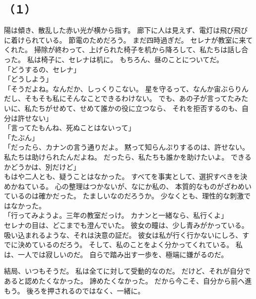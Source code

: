 \documentclass[../IHMain]{subfiles}
\begin{document}
\subsection*{（１）}
陽は傾き、散乱した赤い光が横から指す。
廊下に人は見えず、電灯は飛び飛びに着けられている。
節電のためだろう。
まだ四時過ぎだ。
セレナが教室に来てくれた。
掃除が終わって、上げられた椅子を机から降ろして、私たちは話し合った。
私は椅子に、セレナは机に。
もちろん、昼のことについてだ。\\
「どうするの、セレナ」\\
「どうしよう」\\
「そうだよね。なんだか、しっくりこない。
星を守るって、なんか宙ぶらりんだし、そもそも私にそんなことできるわけない。
でも、あの子が言ってたみたいに、私たちがせめて、せめて誰かの役に立つなら、
それを拒否するのも、自分は許せない」\\
「言ってたもんね、死ぬことはないって」\\
「たぶん」\\
「だったら、カナンの言う通りだよ。
黙って知らんぷりするのは、許せない。
私たちは助けられたんだよね。
だったら、私たちも誰かを助けたいよ。
できるかどうかは、別だけど」\\
もはや二人とも、疑うことはなかった。
すべてを事実として、選択すべきを決めかねている。
心の整理はつかないが、なにか私の、
本質的なものがざわめいているのは確かだった。
たましいなのだろうか。
少なくとも、理性的な刺激ではなかった。\\
「行ってみようよ。三年の教室だっけ。
カナンと一緒なら、私行くよ」\\
セレナの目は、どこまでも澄んでいた。
彼女の瞳は、少し青みがかっている。
吸い込まれるような、それは決意の証だ。
彼女は私が行く行かないにしろ、すでに決めているのだろう。
そして、私のことをよく分かってくれている。
私は、一人では寂しいのだ。
自らで踏み出す一歩を、極端に嫌がるのだ。

結局、いつもそうだ。
私は全てに対して受動的なのだ。
だけど、それが自分であると認めたくなかった。
諦めたくなかった。
だから今こそ、自分から前へ進もう。
後ろを押されるのではなく、一緒に。
\end{document}
